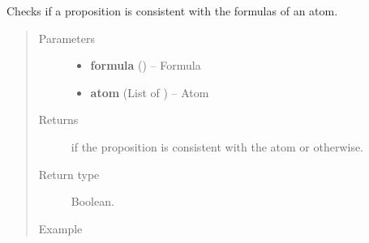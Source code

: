 \documentclass[letterpaper,10pt,english]{sphinxmanual}
\begin{document}

\begin{fulllineitems}
\label{modelCheckingGraph:modelCheckingGraph.propositionConsistent}
Checks if a proposition is consistent with the formulas of an atom.
\begin{quote}\begin{description}
\item[{Parameters}] \leavevmode\begin{itemize}
\item {} 
\textbf{formula} ({\hyperref[formula:formula.Formula]{}}) -- Formula

\item {} 
\textbf{atom} (List of {\hyperref[formula:formula.Formula]{}}) -- Atom

\end{itemize}

\item[{Returns}] \leavevmode
{} if the proposition is consistent with the atom or  otherwise.

\item[{Return type}] \leavevmode
Boolean.

\item[{Example }] \leavevmode
\end{description}\end{quote}


\end{fulllineitems}
\end{document}
